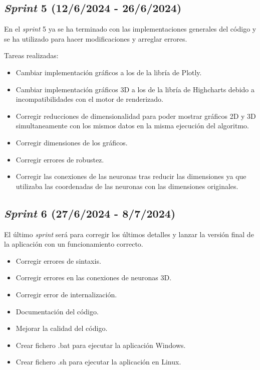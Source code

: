 \subsection{\emph{Sprint} 5 (12/6/2024 - 26/6/2024)}

En el \emph{sprint} 5 ya se ha terminado con las implementaciones generales del código y se ha utilizado para hacer modificaciones y arreglar errores.

Tareas realizadas:

\begin{itemize}
    \item Cambiar implementación gráficos a los de la libría de Plotly.
    \item Cambiar implementación gráficos 3D a los de la libría de Highcharts debido a incompatibilidades con el motor de renderizado.
    \item Corregir reducciones de dimensionalidad para poder mostrar gráficos 2D y 3D simultaneamente con los mismos datos en la misma ejecución del algoritmo.
    \item Corregir dimensiones de los gráficos.
    \item Corregir errores de robustez.
    \item Corregir las conexiones de las neuronas tras reducir las dimensiones ya que utilizaba las coordenadas de las neuronas con las dimensiones originales.
\end{itemize}

\subsection{\emph{Sprint} 6 (27/6/2024 - 8/7/2024)}

El último \emph{sprint} será para corregir los últimos detalles y lanzar la versión final de la aplicación con un funcionamiento correcto.

\begin{itemize}
    \item Corregir errores de sintaxis.
    \item Corregir errores en las conexiones de neuronas 3D.
    \item Corregir error de internalización.
    \item Documentación del código.
    \item Mejorar la calidad del código.
    \item Crear fichero .bat para ejecutar la aplicación Windows.
    \item Crear fichero .sh para ejecutar la aplicación en Linux.
\end{itemize}

